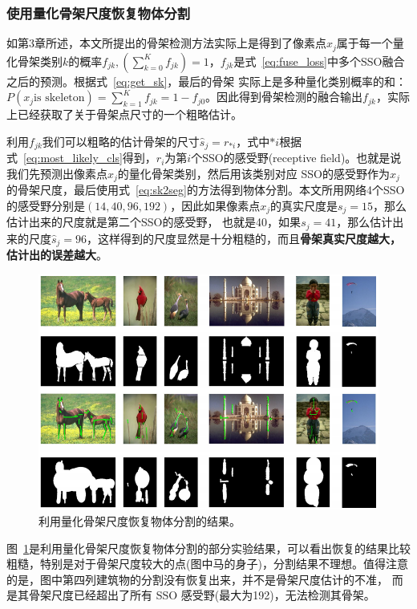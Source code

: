 \documentclass[UTF8]{ctexart}
\numberwithin{equation}{section} %
\numberwithin{table}{section} %
\begin{document}
\subsubsection{使用量化骨架尺度恢复物体分割}
如第3章所述，本文所提出的骨架检测方法实际上是得到了像素点$x_j$属于每一个量化骨架类别$k$的概率$f_{jk},(\sum_{k=0}^K f_{jk})=1$，$f_{jk}$是式~\ref{eq:fuse_loss}中多个SSO融合之后的预测。根据式~\ref{eq:get_sk}，最后的骨架
实际上是多种量化类别概率的和：$P(x_j\text{is skeleton})=\sum_{k=1}^K f_{jk}=1-f_{j0}$。因此得到骨架检测的融合输出$f_{jk}$，实际上已经获取了关于骨架点尺寸的一个粗略估计。

利用$f_{jk}$我们可以粗略的估计骨架的尺寸$\hat{s}_j = r_{*i}$，式中$*i$根据式~\ref{eq:most_likely_cls}得到，$r_i$为第$i$个SSO的感受野(receptive field)。也就是说我们先预测出像素点$x_j$的量化骨架类别，然后用该类别对应
SSO的感受野作为$x_j$的骨架尺度，最后使用式~\ref{eq:sk2seg}的方法得到物体分割。本文所用网络4个SSO的感受野分别是$(14,40,96,192)$，因此如果像素点$x_j$的真实尺度是$s_j = 15$，那么估计出来的尺度就是第二个SSO的感受野，
也就是40，如果$s_j = 41$，那么估计出来的尺度$\hat{s}_j = 96$，这样得到的尺度显然是十分粗糙的，而且\textbf{骨架真实尺度越大，估计出的误差越大}。
\begin{figure}[!htb]
\centering
\includegraphics[scale=0.3]{figures/seg_fsds.png}
\caption{利用量化骨架尺度恢复物体分割的结果。}
\label{fig:seg_fsds}
\end{figure}
图~\ref{fig:seg_fsds}是利用量化骨架尺度恢复物体分割的部分实验结果，可以看出恢复的结果比较粗糙，特别是对于骨架尺度较大的点(图中马的身子)，分割结果不理想。值得注意的是，图中第四列建筑物的分割没有恢复出来，并不是骨架尺度估计的不准，
而是其骨架尺度已经超出了所有 SSO 感受野(最大为192)，无法检测其骨架。
\end{document}
